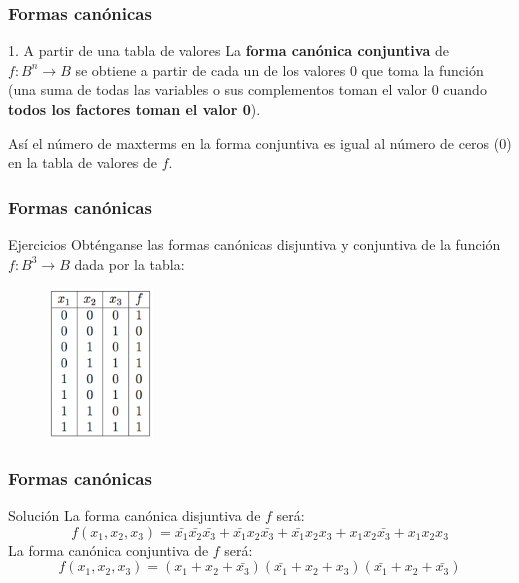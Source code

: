 \documentclass{beamer}
\begin{document}
\begin{frame}
\frametitle{Formas can\'onicas}

\begin{block}{1. A partir de una tabla de valores}
La \textbf{forma can\'onica conjuntiva} de $f:B^n\longrightarrow B$ se obtiene a partir de cada un de los valores 0 que toma la funci\'on (una suma de todas las variables o sus complementos toman el valor 0 cuando \textbf{todos los factores toman el valor 0}).

As\'i el n\'umero de maxterms en la forma conjuntiva es igual al n\'umero de ceros (0) en la tabla de valores de $f$.
\end{block}
\end{frame}


\begin{frame}
\frametitle{Formas can\'onicas}

\begin{block}{Ejercicios}
Obt\'enganse las formas can\'onicas disjuntiva y conjuntiva de la funci\'on $f:B^3\longrightarrow B$ dada por la tabla:

\begin{figure}[h]
\label{fig:volumen}
\centering
\includegraphics[height=4cm]{ex3}
\end{figure}
\end{block}
\end{frame}

\begin{frame}
\frametitle{Formas can\'onicas}

\begin{block}{Soluci\'on}
La forma can\'onica disjuntiva de $f$ ser\'a:
\[f(x_1,x_2,x_3) = \bar{x_1}\bar{x_2}\bar{x_3} + \bar{x_1}{x_2}\bar{x_3} + \bar{x_1}x_2x_3+x_1x_2\bar{x_3}+x_1x_2x_3\]
La forma can\'onica conjuntiva de $f$ ser\'a:
\[f(x_1,x_2,x_3) =(x_1+x_2+\bar{x_3})(\bar{x_1}+x_2+x_3)(\bar{x_1}+x_2+\bar{x_3})\]
\end{block}
\end{frame}
\end{document}
